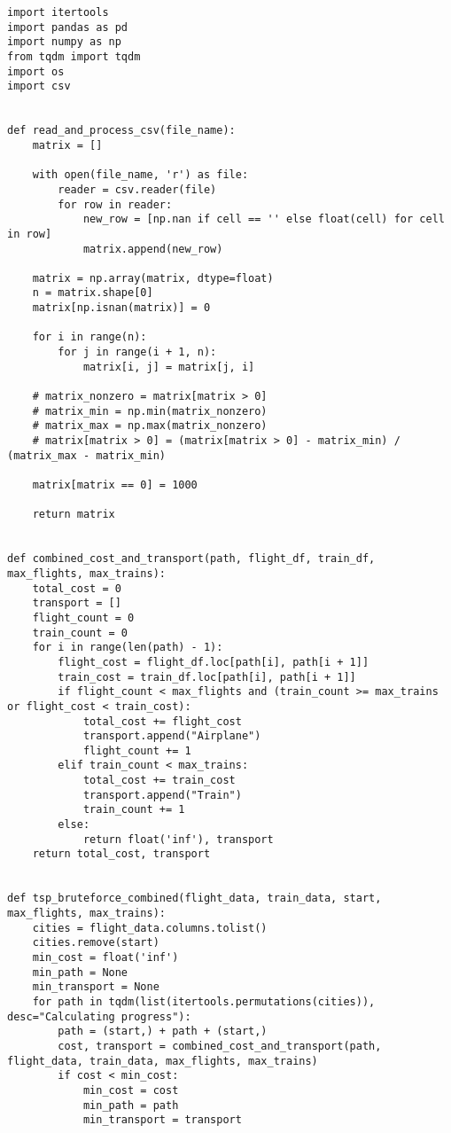 \documentclass{article} %
\begin{document}
\begin{lstlisting}
import itertools
import pandas as pd
import numpy as np
from tqdm import tqdm
import os
import csv


def read_and_process_csv(file_name):
    matrix = []

    with open(file_name, 'r') as file:
        reader = csv.reader(file)
        for row in reader:
            new_row = [np.nan if cell == '' else float(cell) for cell in row]
            matrix.append(new_row)

    matrix = np.array(matrix, dtype=float)
    n = matrix.shape[0]
    matrix[np.isnan(matrix)] = 0

    for i in range(n):
        for j in range(i + 1, n):
            matrix[i, j] = matrix[j, i]

    # matrix_nonzero = matrix[matrix > 0]
    # matrix_min = np.min(matrix_nonzero)
    # matrix_max = np.max(matrix_nonzero)
    # matrix[matrix > 0] = (matrix[matrix > 0] - matrix_min) / (matrix_max - matrix_min)

    matrix[matrix == 0] = 1000

    return matrix


def combined_cost_and_transport(path, flight_df, train_df, max_flights, max_trains):
    total_cost = 0
    transport = []
    flight_count = 0
    train_count = 0
    for i in range(len(path) - 1):
        flight_cost = flight_df.loc[path[i], path[i + 1]]
        train_cost = train_df.loc[path[i], path[i + 1]]
        if flight_count < max_flights and (train_count >= max_trains or flight_cost < train_cost):
            total_cost += flight_cost
            transport.append("Airplane")
            flight_count += 1
        elif train_count < max_trains:
            total_cost += train_cost
            transport.append("Train")
            train_count += 1
        else:
            return float('inf'), transport
    return total_cost, transport


def tsp_bruteforce_combined(flight_data, train_data, start, max_flights, max_trains):
    cities = flight_data.columns.tolist()
    cities.remove(start)
    min_cost = float('inf')
    min_path = None
    min_transport = None
    for path in tqdm(list(itertools.permutations(cities)), desc="Calculating progress"):
        path = (start,) + path + (start,)
        cost, transport = combined_cost_and_transport(path, flight_data, train_data, max_flights, max_trains)
        if cost < min_cost:
            min_cost = cost
            min_path = path
            min_transport = transport


\end{lstlisting}
\end{document}
